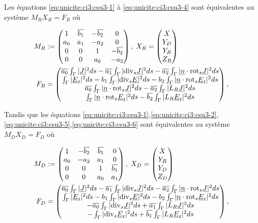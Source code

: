 Les équations \eqref{eq:unicite:ci3:csu3-1} à \eqref{eq:unicite:ci3:csu3-4} sont équivalentes au système $M_R X_R = F_R$ où

\begin{align*}
M_R&:=
\begin{pmatrix}
1&{\overline{b_1}}&-{\overline{b_2}}&0\\
a_0&a_1&-a_2&0\\
0&0&1&-{\overline{b_2}}\\
0&0&a_0&-a_2\\
\end{pmatrix},\;
X_R =
\begin{pmatrix}
X\\
Y_D\\
Y_R\\
Z_R
\end{pmatrix}\\
F_R &=
\begin{pmatrix}
{\overline{a_0}} \int_\Gamma |\underline{J}|^2ds - {\overline{a_1}} \int_\Gamma |{\operatorname{div}_s} \underline{J}|^2 ds - {\overline{a_2}} \int_\Gamma |\underline{n} \cdot {{\operatorname{rot}}_s} \underline{J}|^2 ds \\
\int_\Gamma |\underline{E}_t|^2 ds  - b_1 \int_\Gamma | {\operatorname{div}_s} \underline{E} |^2 ds - b_2 \int_\Gamma | \underline{n} \cdot {{\operatorname{rot}}_s} \underline{E}_t|^2 ds \\
{\overline{a_0}} \int_\Gamma |\underline{n} \cdot {{\operatorname{rot}}_s} \underline{J}|^2ds - {\overline{a_2}} \int_\Gamma | L_R \underline{J}|^2 ds \\
\int_\Gamma | \underline{n} \cdot {{\operatorname{rot}}_s} \underline{E}_t |^2 ds  - {\overline{b_2}} \int_\Gamma | L_R \underline{E}_t|^2 ds
\end{pmatrix},\;
\end{align*}

Tandis que les équations \eqref{eq:unicite:ci3:csu3-1},\eqref{eq:unicite:ci3:csu3-2},\eqref{eq:unicite:ci3:csu3-5},\eqref{eq:unicite:ci3:csu3-6} sont équivalentes au système $M_D X_D= F_D$ où

\begin{align*}
M_D&:=
\begin{pmatrix}
1&-{\overline{b_2}}&{\overline{b_1}}&0\\
a_0&-a_2&a_1&0\\
0&0&1&{\overline{b_1}}\\
0&0&a_0&a_1\\
\end{pmatrix},\;
X_D =
\begin{pmatrix}
X\\
Y_R\\
Y_D\\
Z_D
\end{pmatrix}\\
F_D &=
\begin{pmatrix}
{\overline{a_0}} \int_\Gamma |\underline{J}|^2ds - {\overline{a_1}} \int_\Gamma |{\operatorname{div}_s} \underline{J}|^2 ds - {\overline{a_2}} \int_\Gamma |\underline{n} \cdot {{\operatorname{rot}}_s} \underline{J}|^2 ds \\
\int_\Gamma |\underline{E}_t|^2 ds  - b_1 \int_\Gamma | {\operatorname{div}_s} \underline{E} |^2 ds - b_2 \int_\Gamma | \underline{n} \cdot {{\operatorname{rot}}_s} \underline{E}_t|^2 ds \\
-{\overline{a_0}} \int_\Gamma |{\operatorname{div}_s} \underline{J}|^2ds + {\overline{a_1}} \int_\Gamma | L_R \underline{J}|^2 ds \\
-\int_\Gamma | {\operatorname{div}_s} \underline{E}_t |^2 ds  + {\overline{b_1}} \int_\Gamma | L_R \underline{E}_t|^2 ds
\end{pmatrix},\;
\end{align*}

